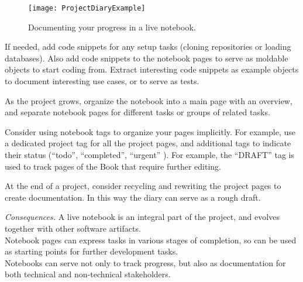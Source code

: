 \documentclass[sigconf,screen]{acmart}
\newcommand\kh[1]{\nbc{Konrad}{#1}{violet}}
\newcommand\cp[1]{\nbe{Cesare}{#1}{olive}} %
\newcommand{\GT}{\lst{GT}\xspace} %
\newcommand{\patsec}[1]{\noindent\textit{#1.}\xspace}
\begin{document}
\begin{figure}[h]
  \texttt{[image: ProjectDiaryExample]}
  \caption{Documenting your progress in a live notebook.}
  \label{fig:ProjectDiary}
\end{figure}

If needed, add code snippets for any setup tasks (\eg cloning repositories or loading databases).
Also add code snippets to the notebook pages to serve as moldable objects to start coding from.
Extract interesting code snippets as example objects to document interesting use cases, or to serve as tests.

As the project grows, organize the notebook into a main page with an overview, and separate notebook pages for different tasks or groups of related tasks.

Consider using notebook tags 
to organize your pages implicitly. For example, use a dedicated project tag for all the project pages, and additional tags to indicate their status (``todo'', ``completed'', ``urgent'' \etc).
For example, the ``DRAFT'' tag is used to track pages of the \GT Book that require further editing.

At the end of a project, consider recycling and rewriting the project pages to create documentation. In this way the diary can serve as a rough draft.


\patsec{Consequences}
A live notebook is an integral part of the project, and evolves together with other software artifacts.\\
Notebook pages can express tasks in various stages of completion, so can be used as starting points for further development tasks.\\
Notebooks can serve not only to track progress, but also as documentation for both technical and non-technical stakeholders.
\end{document}
